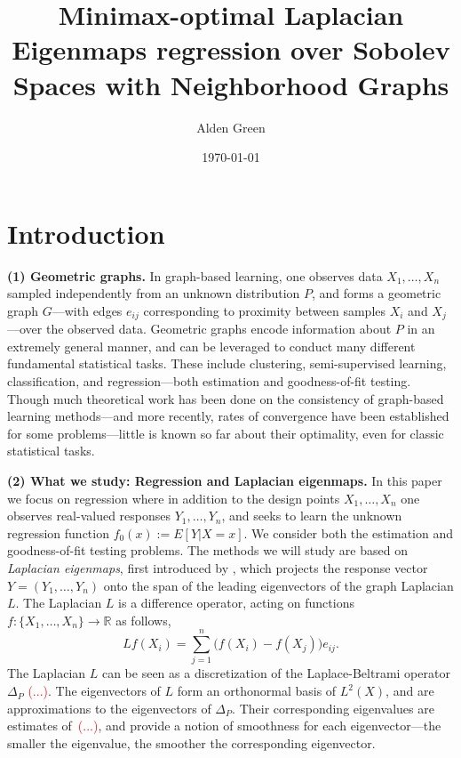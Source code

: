 \documentclass{article}
\newcommand{\Reals}{\mathbb{R}}
\newcommand{\1}{\mathbf{1}}
\theoremstyle{alden}
\theoremstyle{aldenthm}
\theoremstyle{definition}
\theoremstyle{remark}
\begin{document}
\title{Minimax-optimal Laplacian Eigenmaps regression over Sobolev Spaces with Neighborhood Graphs}
\author{Alden Green}
\date{\today}
\maketitle

\section{Introduction}
\label{sec:introduction}

\textbf{(1) Geometric graphs.} In graph-based learning, one observes data $X_1,\ldots,X_n$ sampled independently from an unknown distribution $P$, and forms a geometric graph $G$---with edges $e_{ij}$ corresponding to proximity between samples $X_i$ and $X_j$---over the observed data. Geometric graphs encode information about $P$ in an extremely general manner, and can be leveraged to conduct many different fundamental statistical tasks. These include clustering, semi-supervised learning, classification, and regression---both estimation and goodness-of-fit testing. Though much theoretical work has been done on the consistency of graph-based learning methods---and more recently, rates of convergence have been established for some problems---little is known so far about their optimality, even for classic statistical tasks. 

\textbf{(2) What we study: Regression and Laplacian eigenmaps.} In this paper we focus on regression where in addition to the design points $X_1,\ldots,X_n$ one observes real-valued responses $Y_1,\ldots,Y_n$, and seeks to learn the unknown regression function $f_0(x) := E[Y|X = x]$. We consider both the estimation and goodness-of-fit testing problems. The methods we will study are based on \emph{Laplacian eigenmaps}, first introduced by \cite{belkin03a}, which projects the response vector $Y = (Y_1,\ldots,Y_n)$ onto the span of the leading eigenvectors of the graph Laplacian $L$. The Laplacian $L$ is a difference operator, acting on functions $f: \{X_1,\ldots,X_n\} \to \Reals$ as follows,
\begin{equation}
\label{eqn:graph_laplacian}
Lf(X_i) = \sum_{j = 1}^{n} \bigl(f(X_i) - f(X_j)\bigr)e_{ij}. 
\end{equation}
The Laplacian $L$ can be seen as a discretization of the Laplace-Beltrami operator $\Delta_P$ \textcolor{red}{(...)}. The eigenvectors of $L$ form an orthonormal basis of $L^2(X)$, and are approximations to the eigenvectors of $\Delta_P$. Their corresponding eigenvalues are estimates of~\textcolor{red}{(...)}, and provide a notion of smoothness for each eigenvector---the smaller the eigenvalue, the smoother the corresponding eigenvector. 
\end{document}
